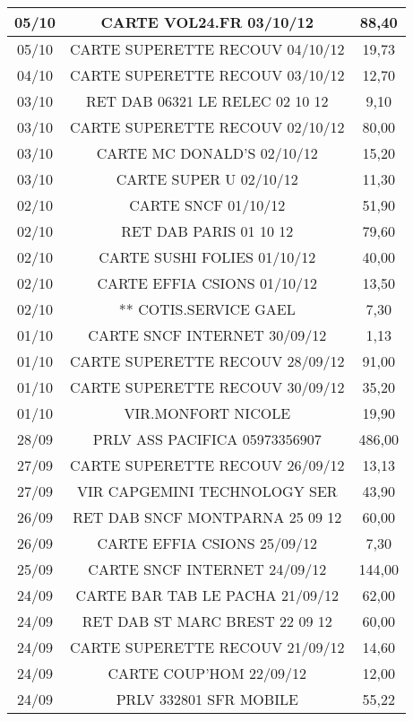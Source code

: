 \begin{longtable}{|c|c|c|}
\hline
05/10 & CARTE VOL24.FR         03/10/12 & 88,40 \\
\hline
05/10 & CARTE SUPERETTE RECOUV 04/10/12 & 19,73 \\
\hline
04/10 & CARTE SUPERETTE RECOUV 03/10/12 & 12,70 \\
\hline
03/10 & RET DAB 06321 LE RELEC 02 10 12 & 9,10 \\
\hline
03/10 & CARTE SUPERETTE RECOUV 02/10/12 & 80,00 \\
\hline
03/10 & CARTE MC DONALD'S      02/10/12 & 15,20 \\
\hline
03/10 & CARTE SUPER U          02/10/12 & 11,30 \\
\hline
02/10 & CARTE SNCF             01/10/12 & 51,90 \\
\hline
02/10 & RET DAB PARIS          01 10 12 & 79,60 \\
\hline
02/10 & CARTE SUSHI FOLIES     01/10/12 & 40,00 \\
\hline
02/10 & CARTE EFFIA CSIONS     01/10/12 & 13,50 \\
\hline
02/10 & ** COTIS.SERVICE GAEL & 7,30 \\
\hline
01/10 & CARTE SNCF INTERNET    30/09/12 & 1,13 \\
\hline
01/10 & CARTE SUPERETTE RECOUV 28/09/12 & 91,00 \\
\hline
01/10 & CARTE SUPERETTE RECOUV 30/09/12 & 35,20 \\
\hline
01/10 & VIR.MONFORT NICOLE & 19,90 \\
\hline
28/09 & PRLV   ASS PACIFICA  05973356907 & 486,00 \\
\hline
27/09 & CARTE SUPERETTE RECOUV 26/09/12 & 13,13 \\
\hline
27/09 & VIR    CAPGEMINI TECHNOLOGY SER & 43,90 \\
\hline
26/09 & RET DAB SNCF MONTPARNA 25 09 12 & 60,00 \\
\hline
26/09 & CARTE EFFIA CSIONS     25/09/12 & 7,30 \\
\hline
25/09 & CARTE SNCF INTERNET    24/09/12 & 144,00 \\
\hline
24/09 & CARTE BAR TAB LE PACHA 21/09/12 & 62,00 \\
\hline
24/09 & RET DAB ST MARC BREST  22 09 12 & 60,00 \\
\hline
24/09 & CARTE SUPERETTE RECOUV 21/09/12 & 14,60 \\
\hline
24/09 & CARTE COUP'HOM         22/09/12 & 12,00 \\
\hline
24/09 & PRLV 332801   SFR MOBILE & 55,22 \\

\end{longtable}
